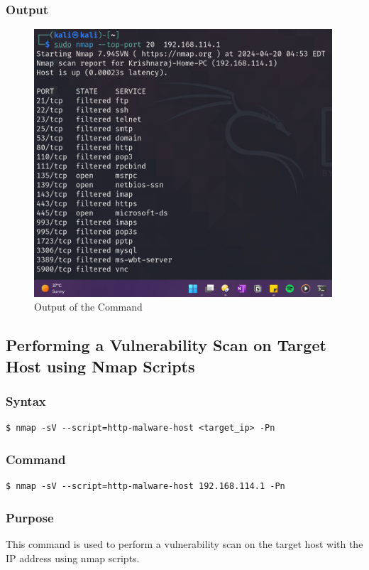 \documentclass[11pt]{article}
\begin{document}
\subsubsection*{Output}
\begin{figure}[H]
    \centering
    \includegraphics[width=0.99\textwidth]{a3_ss (7).png}
    \caption{Output of the Command}
\end{figure}
\subsection{Performing a Vulnerability Scan on Target Host using Nmap Scripts}

\subsubsection*{Syntax}
\begin{verbatim}
$ nmap -sV --script=http-malware-host <target_ip> -Pn
\end{verbatim}

\subsubsection*{Command}
\begin{verbatim}
$ nmap -sV --script=http-malware-host 192.168.114.1 -Pn
\end{verbatim}

\subsubsection*{Purpose}
This command is used to perform a vulnerability scan on the target host with the IP address using nmap scripts.
\end{document}
